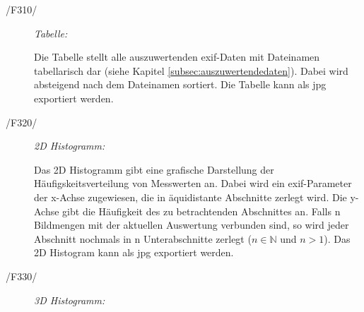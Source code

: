 	\begin{description}

		\item[/F310/] \textit{Tabelle:}\par 
		
			\begin{figure}[H]
				\centering
			\end{figure}			
			Die Tabelle stellt alle auszuwertenden \gls{exif}-Daten mit Dateinamen tabellarisch dar (siehe Kapitel \ref{subsec:auszuwertendedaten}). Dabei wird absteigend nach dem Dateinamen sortiert. Die Tabelle kann als \gls{jpg} exportiert werden.

		\item[/F320/] \textit{2D Histogramm:}\par 
		
			\begin{figure}[H]
				\centering
			\end{figure}
			Das 2D Histogramm gibt eine grafische Darstellung der Häufigskeitsverteilung von Messwerten an. Dabei wird ein \gls{exif}-Parameter der x-Achse zugewiesen, die in äquidistante Abschnitte zerlegt wird. Die y-Achse gibt die Häufigkeit des zu betrachtenden Abschnittes an. Falls n Bildmengen mit der aktuellen Auswertung verbunden sind, so wird jeder Abschnitt nochmals in n Unterabschnitte zerlegt ($ n \in \mathbb{N} $ und $ n>1 $). Das 2D Histogram kann als \gls{jpg} exportiert werden.
			

		\item[/F330/] \textit{3D Histogramm:}\par
			

\end{description}
